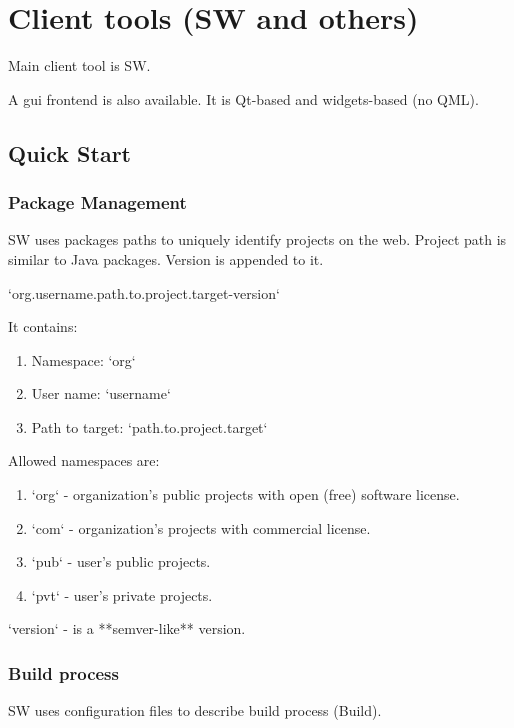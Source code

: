 

\chapter{Client tools (SW and others)}

Main client tool is SW.

A gui frontend is also available. It is Qt-based and widgets-based (no QML).

\section{Quick Start}



\subsection{Package Management}

SW uses packages paths to uniquely identify projects on the web.
Project path is similar to Java packages. Version is appended to it.

`org.username.path.to.project.target-version`

It contains:
\begin{enumerate}
\item
Namespace: `org`
\item
User name: `username`
\item
Path to target: `path.to.project.target`
\end{enumerate}

Allowed namespaces are:
\begin{enumerate}
\item
`org` - organization's public projects with open (free) software license.
\item
`com` - organization's projects with commercial license.
\item
`pub` - user's public projects.
\item
`pvt` - user's private projects.
\end{enumerate}

`version` - is a **semver-like** version.

\subsection{Build process}

SW uses configuration files to describe build process (Build).


